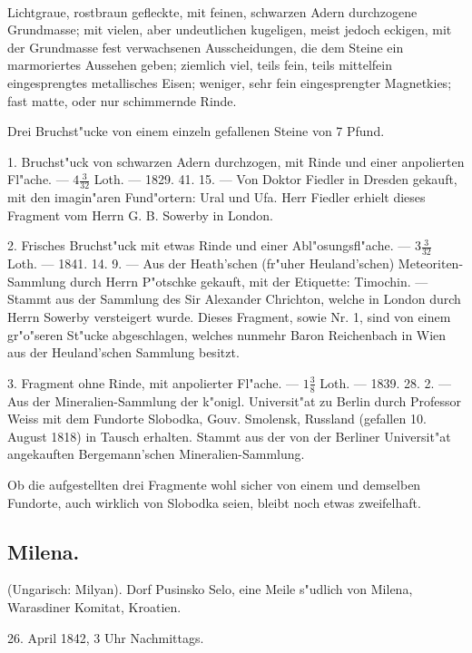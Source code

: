 \documentclass[a4paper, 11pt, oneside, polutonikogreek, german]{article}
\begin{document}
\paragraph{}
Lichtgraue, rostbraun gefleckte, mit feinen, schwarzen Adern durchzogene Grundmasse; mit vielen, aber undeutlichen kugeligen, meist jedoch eckigen, mit der Grundmasse fest verwachsenen Ausscheidungen, die dem Steine ein marmoriertes Aussehen geben; ziemlich viel, teils fein, teils mittelfein eingesprengtes metallisches Eisen; weniger, sehr fein eingesprengter Magnetkies; fast matte, oder nur schimmernde Rinde.

Drei Bruchst"ucke von einem einzeln gefallenen Steine von 7 Pfund.

1. Bruchst"uck von schwarzen Adern durchzogen, mit Rinde und einer anpolierten Fl"ache. --- $4\frac{3}{32}$ Loth. --- 1829. 41. 15. --- Von Doktor Fiedler in Dresden gekauft, mit den imagin"aren Fund"ortern: Ural und Ufa. Herr Fiedler erhielt dieses Fragment vom Herrn G. B. Sowerby in London.

2. Frisches Bruchst"uck mit etwas Rinde und einer Abl"osungsfl"ache. --- $3\frac{3}{32}$ Loth. --- 1841. 14. 9. --- Aus der Heath'schen (fr"uher Heuland'schen) Meteoriten-Sammlung durch Herrn P"otschke gekauft, mit der Etiquette: Timochin. --- Stammt aus der Sammlung des Sir Alexander Chrichton, welche in London durch Herrn Sowerby versteigert wurde. Dieses Fragment, sowie Nr. 1, sind von einem gr"o"seren St"ucke abgeschlagen, welches nunmehr Baron Reichenbach in Wien aus der Heuland'schen Sammlung besitzt.

3. Fragment ohne Rinde, mit anpolierter Fl"ache. --- $1\frac{3}{8}$ Loth. --- 1839. 28. 2. --- Aus der Mineralien-Sammlung der k"onigl. Universit"at zu Berlin durch Professor Weiss mit dem Fundorte Slobodka‚ Gouv. Smolensk, Russland (gefallen 10. August 1818) in Tausch erhalten. Stammt aus der von der Berliner Universit"at angekauften Bergemann’schen Mineralien-Sammlung.

\setlength{\leftskip}{10mm}
\setlength{\parindent}{0pt}

{\footnotesize Ob die aufgestellten drei Fragmente wohl sicher von einem und demselben Fundorte, auch wirklich von Slobodka seien, bleibt noch etwas zweifelhaft.}

\setlength{\leftskip}{0pt}
\setlength{\parindent}{20pt}

\subsection{Milena.}
\begin{center}
\small
(Ungarisch: Milyan). Dorf Pusinsko Selo, eine Meile s"udlich von Milena, Warasdiner Komitat, Kroatien.

26. April 1842, 3 Uhr Nachmittags.
\end{center}
\end{document}
